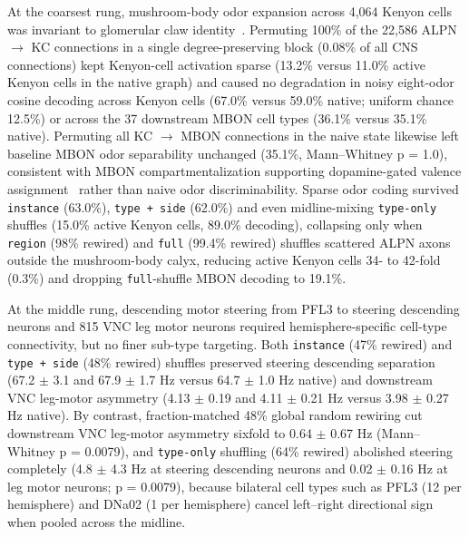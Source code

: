 \documentclass[11pt,a4paper]{article}
\begin{document}
At the coarsest rung, mushroom-body odor expansion across 4,064 Kenyon cells was invariant to glomerular claw identity~\cite{caron2013random}. Permuting 100\% of the 22,586 ALPN $\rightarrow$ KC connections in a single degree-preserving block (0.08\% of all CNS connections) kept Kenyon-cell activation sparse (13.2\% versus 11.0\% active Kenyon cells in the native graph) and caused no degradation in noisy eight-odor cosine decoding across Kenyon cells (67.0\% versus 59.0\% native; uniform chance 12.5\%) or across the 37 downstream MBON cell types (36.1\% versus 35.1\% native). Permuting all KC $\rightarrow$ MBON connections in the naive state likewise left baseline MBON odor separability unchanged (35.1\%, Mann--Whitney p = 1.0), consistent with MBON compartmentalization supporting dopamine-gated valence assignment~\cite{aso2014neuronal} rather than naive odor discriminability. Sparse odor coding survived \texttt{instance} (63.0\%), \texttt{type + side} (62.0\%) and even midline-mixing \texttt{type-only} shuffles (15.0\% active Kenyon cells, 89.0\% decoding), collapsing only when \texttt{region} (98\% rewired) and \texttt{full} (99.4\% rewired) shuffles scattered ALPN axons outside the mushroom-body calyx, reducing active Kenyon cells 34- to 42-fold (0.3\%) and dropping \texttt{full}-shuffle MBON decoding to 19.1\%.

At the middle rung, descending motor steering from PFL3 to steering descending neurons and 815 VNC leg motor neurons required hemisphere-specific cell-type connectivity, but no finer sub-type targeting. Both \texttt{instance} (47\% rewired) and \texttt{type + side} (48\% rewired) shuffles preserved steering descending separation (67.2 $\pm$ 3.1 and 67.9 $\pm$ 1.7 Hz versus 64.7 $\pm$ 1.0 Hz native) and downstream VNC leg-motor asymmetry (4.13 $\pm$ 0.19 and 4.11 $\pm$ 0.21 Hz versus 3.98 $\pm$ 0.27 Hz native). By contrast, fraction-matched 48\% global random rewiring cut downstream VNC leg-motor asymmetry sixfold to 0.64 $\pm$ 0.67 Hz (Mann--Whitney p = 0.0079), and \texttt{type-only} shuffling (64\% rewired) abolished steering completely (4.8 $\pm$ 4.3 Hz at steering descending neurons and 0.02 $\pm$ 0.16 Hz at leg motor neurons; p = 0.0079), because bilateral cell types such as PFL3 (12 per hemisphere) and DNa02 (1 per hemisphere) cancel left--right directional sign when pooled across the midline.
\end{document}

